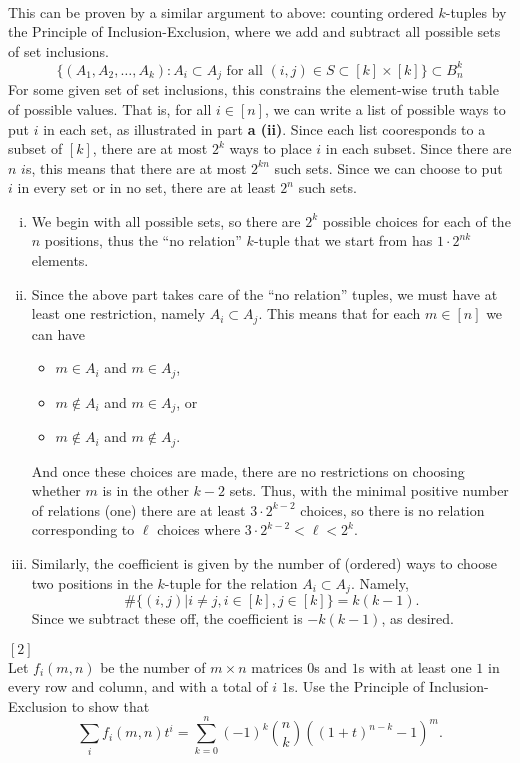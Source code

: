 \documentclass{article}
\newenvironment{problem}[2][Problem]{\begin{trivlist}
\item[\hskip \labelsep {\bfseries #1}\hskip \labelsep {\bfseries #2.}]}{\end{trivlist}}
\newenvironment{solution}[1][Solution.]{\begin{trivlist}
\item[\hskip \labelsep {\bfseries #1}]}{\end{trivlist}}
\begin{document}
\begin{solution} \text{} \\
  This can be proven by a similar argument to above: counting ordered
  $k$-tuples by the Principle of Inclusion-Exclusion, where we add and subtract
  all possible sets of set inclusions. \[
    \{(A_1, A_2, \hdots, A_k) : A_i \subset A_j \text{ for all } (i, j) \in S \subset [k] \times [k] \} \subset B_n^k
  \]
  For some given set of set inclusions, this constrains the element-wise truth
  table of possible values. That is, for all $i \in [n]$, we can write a list
  of possible ways to put $i$ in each set, as illustrated in part
  \textbf{a (ii)}. Since each list cooresponds to a subset of $[k]$, there are
  at most $2^k$ ways to place $i$ in each subset. Since there are $n$ $i$s, this
  means that there are at most $2^{kn}$ such sets. Since we can choose to put
  $i$ in every set or in no set, there are at least $2^n$ such sets.
  \\
  \begin{enumerate}[(i)]
    \item We begin with all possible sets, so there are $2^k$ possible choices for
    each of the $n$ positions, thus the ``no relation'' $k$-tuple that we start from
    has $1\cdot 2^{nk}$ elements.
    \item Since the above part takes care of the ``no relation'' tuples, we must
    have at least one restriction, namely $A_i \subset A_j$. This means that
    for each $m \in [n]$ we can have
    \begin{itemize}
      \item $m \in A_i$ and $m \in A_j$,
      \item $m \not\in A_i$ and $m \in A_j$, or
      \item $m \not\in A_i$ and $m \not\in A_j$.
    \end{itemize}
    And once these choices are made, there are no restrictions on choosing
    whether $m$ is in the other $k - 2$ sets. Thus, with the minimal positive number
    of relations (one) there are at least $3 \cdot 2^{k - 2}$ choices, so
    there is no relation corresponding to $\ell$ choices where
    $3 \cdot 2^{k - 2} < \ell < 2^k$.
    \item Similarly, the coefficient is given by the number of (ordered) ways to
    choose two positions in the $k$-tuple for the relation $A_i \subset A_j$.
    Namely, \[
      \#\{(i, j) | i \neq j, i \in [k], j \in [k] \} = k(k-1).
    \]
    Since we subtract these off, the coefficient is $-k(k-1)$, as desired.
  \end{enumerate}
\end{solution}
\pagebreak
\begin{problem}{25 (a)} $[2]$ \\
  Let $f_i(m, n)$ be the number of $m \times n$ matrices $0$s and $1$s with
  at least one $1$ in every row and column, and with a total of $i$ $1$s. Use
  the Principle of Inclusion-Exclusion to show that \[
    \sum_i f_i(m, n) t^i
    = \sum_{k=0}^n (-1)^k \binom nk ((1 + t)^{n - k} - 1)^m.
  \]
\end{problem}
\end{document}
